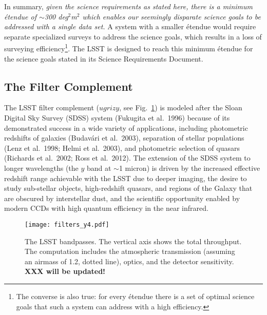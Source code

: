 In summary,
{\it given the science requirements as stated here, there is a
minimum \'etendue of $\sim$300 deg$^2$m$^2$ which enables our seemingly
disparate science goals to be addressed with a single data set.}
A system with a smaller \'etendue would require separate specialized surveys
to address the science goals, which results in a loss of surveying
efficiency\footnote{The converse is also true: for every \'etendue
there is a set of optimal science goals that such a system can
address with a high efficiency.}. The LSST is designed to reach this
minimum \'etendue for the science goals stated in its Science Requirements
Document.



\subsection{  The Filter Complement }

The LSST filter complement ($ugrizy$, see Fig.~\ref{Fig:filters}) is modeled after the Sloan
Digital Sky Survey
(SDSS) system (Fukugita et al.~1996) because of its demonstrated success in a wide
variety of applications, including photometric redshifts of galaxies (Budav\'{a}ri
et al.~2003), separation of stellar populations (Lenz et al.~1998; Helmi et al.~2003),
and photometric selection of quasars (Richards et al.~2002; Ross et al.~2012). The extension of the
SDSS system to longer wavelengths
(the $y$ band at $\sim$1 micron) is driven by the increased effective redshift
range achievable with the LSST due to deeper imaging, the desire to study sub-stellar
objects, high-redshift quasars, and regions of the Galaxy that are obscured by
interstellar dust, and
the scientific opportunity enabled by modern CCDs with high quantum efficiency
in the near infrared.


\begin{figure}
\texttt{[image: filters\_y4.pdf]}
\caption{The LSST bandpasses. The vertical axis shows the total throughput. The computation
includes the atmospheric transmission (assuming an airmass of 1.2, %
dotted line), optics, and the detector sensitivity. {\bf XXX will be updated!}}
\label{Fig:filters}
\end{figure}


